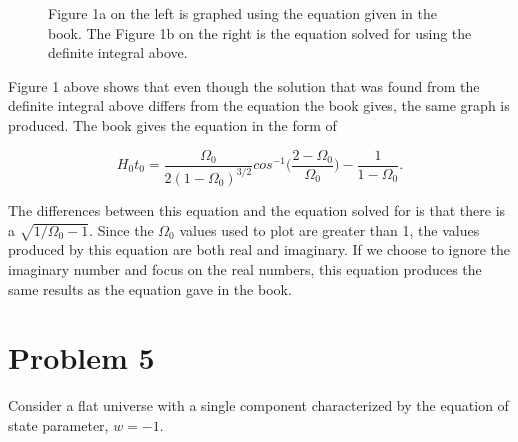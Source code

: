 \documentclass[12pt]{article}
\begin{document}
\begin{figure}[h!]
    \centering
    \qquad
    \caption{Figure 1a on the left is graphed using the equation given in the book. The Figure 1b on the right is the equation solved for using the definite integral above.}%
    \label{fig:example}%
\end{figure}


Figure 1 above shows that even though the solution that was found from the definite integral above differs from the equation the book gives, the same graph is produced. The book gives the equation in the form of 

$$
H_{0}t_{0} = \frac{\Omega_{0}}{2(1 - \Omega_{0})^{3/2}}cos^{-1}\Big(\frac{2 - \Omega_{0}}{\Omega_{0}}\Big) - \frac{1}{1 - \Omega_{0}}.
$$

The differences between this equation and the equation solved for is that there is a $\sqrt{1/\Omega_{0} - 1}$. Since the $\Omega_{0}$ values used to plot are greater than 1, the values produced by this equation are both real and imaginary. If we choose to ignore the imaginary number and focus on the real numbers, this equation produces the same results as the equation gave in the book.



\section*{Problem 5}

Consider a flat universe with a single component characterized by the equation of state parameter, $w = -1$.
\end{document}
